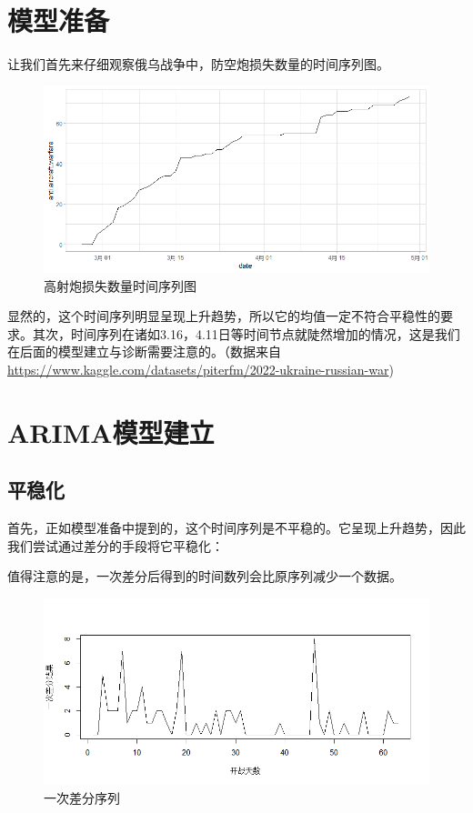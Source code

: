 \documentclass{article}
\begin{document}
	
\tableofcontents

	\newpage
	
	\section{模型准备}
	
	
	让我们首先来仔细观察俄乌战争中，防空炮损失数量的时间序列图。
	
	
			\begin{figure}[h]
				\centering
				\includegraphics[width=.9\textwidth]{Rplot01.png}
				\caption{高射炮损失数量时间序列图}
			\end{figure}
	
	显然的，这个时间序列明显呈现上升趋势，所以它的均值一定不符合平稳性的要求。其次，时间序列在诸如3.16，4.11日等时间节点就陡然增加的情况，这是我们在后面的模型建立与诊断需要注意的。（数据来自\url{https://www.kaggle.com/datasets/piterfm/2022-ukraine-russian-war})
	
	
	\section{ARIMA模型建立}
	
	\subsection{平稳化}
	
	首先，正如模型准备中提到的，这个时间序列是不平稳的。它呈现上升趋势，因此我们尝试通过差分的手段将它平稳化：
	


    值得注意的是，一次差分后得到的时间数列会比原序列减少一个数据。

	\begin{figure}[H]
	\centering
	\includegraphics[width=.9\textwidth]{Rplot02.png}
	\caption{一次差分序列}
    \end{figure}
	
\end{document}

